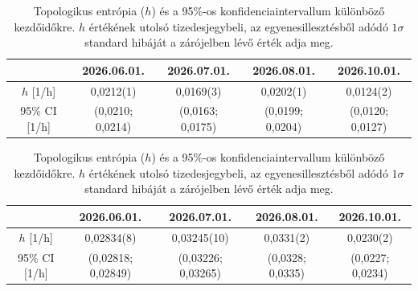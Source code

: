 \documentclass[12pt,a4paper]{article}
\begin{document}
\begin{table}[H]
    \centering
    \begin{subtable}{\textwidth}
        \centering
        \begin{tabular}{|c|c|c|c|c|}\hline
            & \textbf{2026.06.01.} & \textbf{2026.07.01.} & \textbf{2026.08.01.} & \textbf{2026.10.01.} \\\hline
            $h$ [1/h] & 0,0212(1) & 0,0169(3) & 0,0202(1) & 0,0124(2) \\\hline
            95\% CI [1/h] & (0,0210; 0,0214) & (0,0163; 0,0175) & (0,0199; 0,0204) & (0,0120; 0,0127) \\\hline
        \end{tabular}
        \caption{AIFS}
    \end{subtable}

    \vspace{0.6cm}

    \begin{subtable}{\textwidth}
        \centering
        \begin{tabular}{|c|c|c|c|c|}\hline
            & \textbf{2026.06.01.} & \textbf{2026.07.01.} & \textbf{2026.08.01.} & \textbf{2026.10.01.} \\\hline
            $h$ [1/h] & 0,02834(8) & 0,03245(10) & 0,0331(2) & 0,0230(2) \\\hline
            95\% CI [1/h] & (0,02818; 0,02849) & (0,03226; 0,03265) & (0,0328; 0,0335) & (0,0227; 0,0234) \\\hline
        \end{tabular}
        \caption{IFS}
    \end{subtable}
    \caption{Topologikus entrópia ($h$) és a 95\%-os konfidenciaintervallum különböző kezdőidőkre. $h$ értékének utolsó tizedesjegybeli, az egyenesillesztésből adódó $1 \sigma$ standard hibáját a zárójelben lévő érték adja meg.}
    \label{tab:jet700_top}
\end{table}
\end{document}
